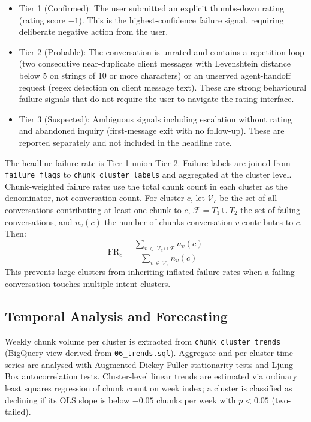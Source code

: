 \documentclass[conference]{IEEEtran}
\begin{document}
\begin{itemize}
  \item Tier 1 (Confirmed): The user submitted an explicit thumbs-down rating (rating score $-1$). This is the highest-confidence failure signal, requiring deliberate negative action from the user.
  \item Tier 2 (Probable): The conversation is unrated and contains a repetition loop (two consecutive near-duplicate client messages with Levenshtein distance below 5 on strings of 10 or more characters) or an unserved agent-handoff request (regex detection on client message text). These are strong behavioural failure signals that do not require the user to navigate the rating interface.
  \item Tier 3 (Suspected): Ambiguous signals including escalation without rating and abandoned inquiry (first-message exit with no follow-up). These are reported separately and not included in the headline rate.
\end{itemize}

The headline failure rate is Tier 1 union Tier 2. Failure labels are joined from \texttt{failure\_flags} to \texttt{chunk\_cluster\_labels} and aggregated at the cluster level. Chunk-weighted failure rates use the total chunk count in each cluster as the denominator, not conversation count. For cluster $c$, let $\mathcal{V}_c$ be the set of all conversations contributing at least one chunk to $c$, $\mathcal{F} = T_1 \cup T_2$ the set of failing conversations, and $n_v(c)$ the number of chunks conversation $v$ contributes to $c$. Then:
\begin{equation}
  \mathrm{FR}_c
  = \frac{\displaystyle\sum_{v\,\in\,\mathcal{V}_c \cap \mathcal{F}} n_v(c)}
         {\displaystyle\sum_{v\,\in\,\mathcal{V}_c} n_v(c)}
  \label{eq:chunkfr}
\end{equation}
This prevents large clusters from inheriting inflated failure rates when a failing conversation touches multiple intent clusters.

\subsection{Temporal Analysis and Forecasting}

Weekly chunk volume per cluster is extracted from \texttt{chunk\_cluster\_trends} (BigQuery view derived from \texttt{06\_trends.sql}). Aggregate and per-cluster time series are analysed with Augmented Dickey-Fuller stationarity tests and Ljung-Box autocorrelation tests. Cluster-level linear trends are estimated via ordinary least squares regression of chunk count on week index; a cluster is classified as declining if its OLS slope is below $-0.05$ chunks per week with $p < 0.05$ (two-tailed).
\end{document}
